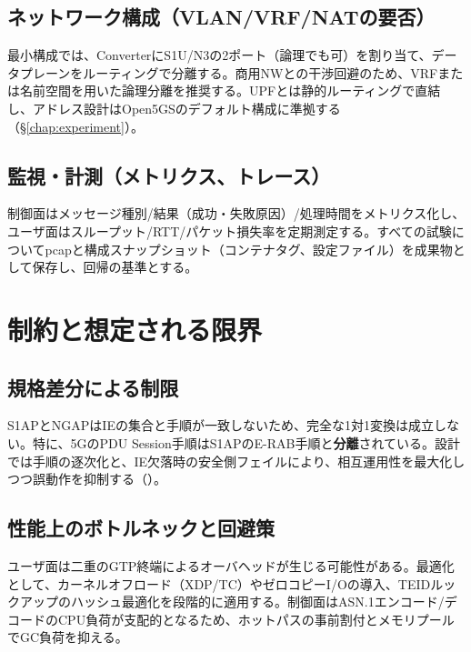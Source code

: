 \subsection{ネットワーク構成（VLAN/VRF/NATの要否）}
最小構成では、ConverterにS1U/N3の2ポート（論理でも可）を割り当て、データプレーンをルーティングで分離する。商用NWとの干渉回避のため、VRFまたは名前空間を用いた論理分離を推奨する。UPFとは静的ルーティングで直結し、アドレス設計はOpen5GSのデフォルト構成に準拠する（\S\ref{chap:experiment}）。

\subsection{監視・計測（メトリクス、トレース）}
制御面はメッセージ種別/結果（成功・失敗原因）/処理時間をメトリクス化し、ユーザ面はスループット/RTT/パケット損失率を定期測定する。すべての試験についてpcapと構成スナップショット（コンテナタグ、設定ファイル）を成果物として保存し、回帰の基準とする。

\section{制約と想定される限界}
\subsection{規格差分による制限}
S1APとNGAPはIEの集合と手順が一致しないため、完全な1対1変換は成立しない。特に、5GのPDU Session手順はS1APのE-RAB手順と\textbf{分離}されている。設計では手順の逐次化と、IE欠落時の安全側フェイルにより、相互運用性を最大化しつつ誤動作を抑制する（\cite{threegpp-23501,threegpp-23502}）。

\subsection{性能上のボトルネックと回避策}
ユーザ面は二重のGTP終端によるオーバヘッドが生じる可能性がある。最適化として、カーネルオフロード（XDP/TC）やゼロコピーI/Oの導入、TEIDルックアップのハッシュ最適化を段階的に適用する。制御面はASN.1エンコード/デコードのCPU負荷が支配的となるため、ホットパスの事前割付とメモリプールでGC負荷を抑える。

